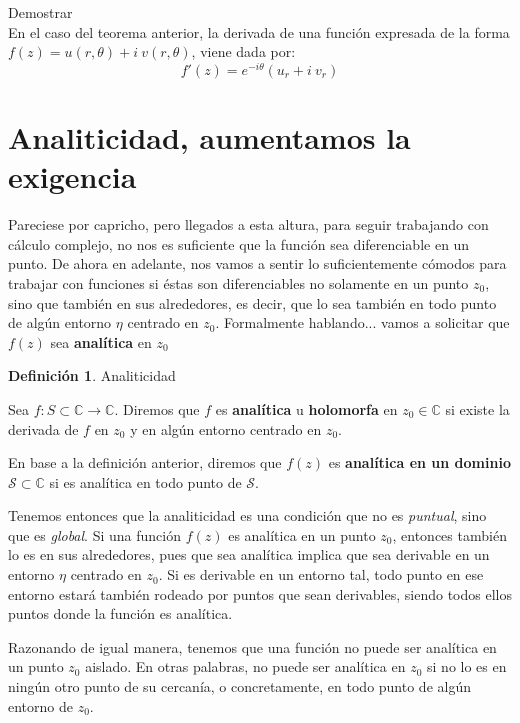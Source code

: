 \documentclass[12pt]{article}
\theoremstyle{definition}
\newtheorem{definition}{Definici\'on}[section]
\theoremstyle{theorem}
\theoremstyle{corolary}
\begin{document}
Demostrar\\


En el caso del teorema anterior, la derivada de una funci\'on expresada de la forma $f(z) = u(r, \theta) + i\  v(r, \theta)$, viene dada por: $$f'(z) = e^{-i\theta}(u_r + i\ v_r)$$


\section{Analiticidad, aumentamos la exigencia}
Pareciese por capricho, pero llegados a esta altura, para seguir trabajando con c\'alculo complejo, no nos es suficiente que la funci\'on sea diferenciable en un punto. De ahora en adelante, nos vamos a sentir lo suficientemente c\'omodos para trabajar con funciones si \'estas son diferenciables no solamente en un punto $z_0$, sino que tambi\'en en sus alrededores, es decir, que lo sea tambi\'en en todo punto de alg\'un entorno $\eta$ centrado en $z_0$. Formalmente hablando... vamos a solicitar que $f(z)$ sea \textbf{anal\'itica} en $z_0$\\

\colorbox{blue!40!white!80}{\parbox{\linewidth}{
 \theoremstyle{definition}
 \begin{definition}{Analiticidad}

  	Sea $f: S \subset \mathbb{C} \rightarrow \mathbb{C}$. Diremos que $f$ es \textbf{anal\'itica} u \textbf{holomorfa} en $z_0 \in \mathbb{C}$ si existe la derivada de $f$ en $z_0$ y en alg\'un entorno centrado en $z_0$.
 \end{definition}}}
 \linebreak
 \linebreak

En base a la definici\'on anterior, diremos que $f(z)$ es \textbf{anal\'itica en un dominio} $\mathcal{S} \subset \mathbb{C}$ si es anal\'itica en todo punto de $\mathcal{S}$.

Tenemos entonces que la analiticidad es una condici\'on que no es \textit{puntual}, sino que es \textit{global}. Si una funci\'on $f(z)$ es anal\'itica en un punto $z_0$, entonces tambi\'en lo es en sus alrededores, pues que sea anal\'itica implica que sea derivable en un entorno $\eta$ centrado en $z_0$. Si es derivable en un entorno tal, todo punto en ese entorno estar\'a tambi\'en rodeado por puntos que sean derivables, siendo todos ellos puntos donde la funci\'on es anal\'itica.

Razonando de igual manera, tenemos que una funci\'on no puede ser anal\'itica en un punto $z_0$ aislado. En otras palabras, no puede ser anal\'itica en $z_0$ si no lo es en ning\'un otro punto de su cercan\'ia, o concretamente, en todo punto de alg\'un entorno de $z_0$.\\
\end{document}
